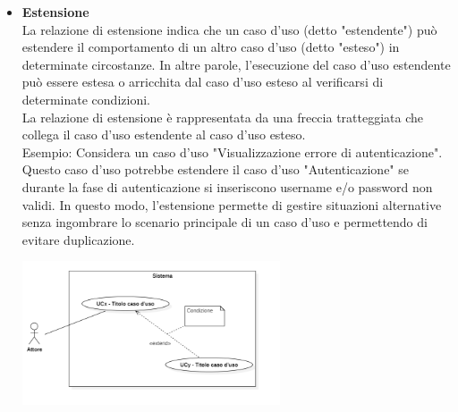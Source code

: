 \begin{itemize}
\begin{itemize}
        \item \textbf{Estensione} \\
        La relazione di estensione indica che un caso d'uso (detto "estendente") può estendere il comportamento di un altro caso d'uso (detto "esteso") in determinate circostanze. In altre parole, l'esecuzione del caso d'uso estendente può essere estesa o arricchita dal caso d'uso esteso al verificarsi di determinate condizioni. \\
        La relazione di estensione è rappresentata da una freccia tratteggiata che collega il caso d'uso estendente al caso d'uso esteso. \\
        Esempio: Considera un caso d'uso "Visualizzazione errore di autenticazione". Questo caso d'uso potrebbe estendere il caso d'uso "Autenticazione" se durante la fase di autenticazione si inseriscono username e/o password non validi. In questo modo, l'estensione permette di gestire situazioni alternative senza ingombrare lo scenario principale di un caso d'uso e permettendo di evitare duplicazione.
        \begin{minipage}[t]{\linewidth}
            \centering
            \includegraphics[width=0.6\textwidth]{../Images/NormeDiProgetto/Estensione.PNG}
        \end{minipage}


\end{itemize}
\end{itemize}
